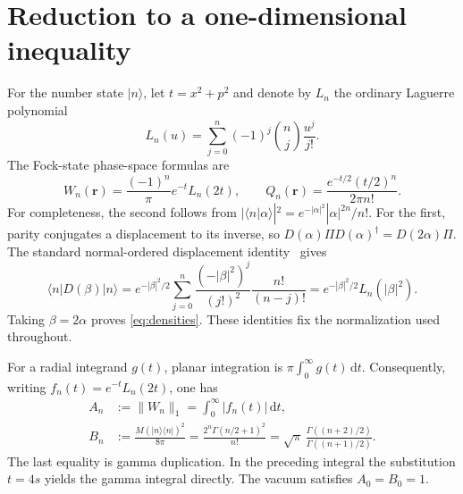 \documentclass[11pt]{article}
\newcommand{\dd}{\,\mathrm d}
\newcommand{\ket}[1]{\lvert #1\rangle}
\newcommand{\bra}[1]{\langle #1\rvert}
\newcommand{\norm}[1]{\lVert #1\rVert}
\begin{document}
\section{Reduction to a one-dimensional inequality}
For the number state $\ket n$, let $t=x^2+p^2$ and denote by $L_n$ the ordinary Laguerre polynomial
\begin{equation}
 L_n(u)=\sum_{j=0}^n(-1)^j\binom{n}{j}\frac{u^j}{j!}.
\end{equation}
The Fock-state phase-space formulas are
\begin{equation}\label{eq:densities}
 W_n(\mathbf r)=\frac{(-1)^n}{\pi}e^{-t}L_n(2t),\qquad
 Q_n(\mathbf r)=\frac{e^{-t/2}(t/2)^n}{2\pi n!}.
\end{equation}
For completeness, the second follows from $|\langle n|\alpha\rangle|^2=e^{-|\alpha|^2}|\alpha|^{2n}/n!$. For the first, parity conjugates a displacement to its inverse, so $D(\alpha)\Pi D(\alpha)^\dagger=D(2\alpha)\Pi$. The standard normal-ordered displacement identity~\cite{cahill} gives
\[
 \bra n D(\beta)\ket n=e^{-|\beta|^2/2}\sum_{j=0}^n\frac{(-|\beta|^2)^j}{(j!)^2}\frac{n!}{(n-j)!}
 =e^{-|\beta|^2/2}L_n(|\beta|^2).
\]
Taking $\beta=2\alpha$ proves \eqref{eq:densities}. These identities fix the normalization used throughout.

For a radial integrand $g(t)$, planar integration is $\pi\int_0^\infty g(t)\dd t$. Consequently, writing $f_n(t)=e^{-t}L_n(2t)$, one has
\begin{align}
 A_n&:=\norm{W_n}_1=\int_0^\infty |f_n(t)|\dd t,\\
 B_n&:=\frac{M(\ket n\bra n)^2}{8\pi}
 =\frac{2^n\Gamma(n/2+1)^2}{n!}
 =\sqrt\pi\,\frac{\Gamma((n+2)/2)}{\Gamma((n+1)/2)}.\label{eq:B}
\end{align}
The last equality is gamma duplication. In the preceding integral the substitution $t=4s$ yields the gamma integral directly. The vacuum satisfies $A_0=B_0=1$.
\end{document}
